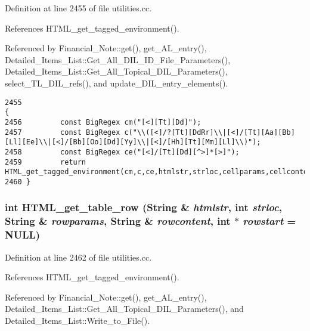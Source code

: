 Definition at line 2455 of file utilities.cc.

References HTML\_\-get\_\-tagged\_\-environment().

Referenced by Financial\_\-Note::get(), get\_\-AL\_\-entry(), Detailed\_\-Items\_\-List::Get\_\-All\_\-DIL\_\-ID\_\-File\_\-Parameters(), Detailed\_\-Items\_\-List::Get\_\-All\_\-Topical\_\-DIL\_\-Parameters(), select\_\-TL\_\-DIL\_\-refs(), and update\_\-DIL\_\-entry\_\-elements().



\footnotesize\begin{verbatim}2455                                                                                                                          {
2456         const BigRegex cm("[<][Tt][Dd]");
2457         const BigRegex c("\\([<]/?[Tt][DdRr]\\|[<]/[Tt][Aa][Bb][Ll][Ee]\\|[<]/[Bb][Oo][Dd][Yy]\\|[<]/[Hh][Tt][Mm][Ll]\\)");
2458         const BigRegex ce("[<]/[Tt][Dd][^>]*[>]");
2459         return HTML_get_tagged_environment(cm,c,ce,htmlstr,strloc,cellparams,cellcontent,cellstart);
2460 }
\end{verbatim}\normalsize 
{}
\subsubsection{\setlength{\rightskip}{0pt plus 5cm}int HTML\_\-get\_\-table\_\-row ({\bf String} \& {\em htmlstr}, int {\em strloc}, {\bf String} \& {\em rowparams}, {\bf String} \& {\em rowcontent}, int $\ast$ {\em rowstart} = NULL)}\label{utilities_8cc_a55}




Definition at line 2462 of file utilities.cc.

References HTML\_\-get\_\-tagged\_\-environment().

Referenced by Financial\_\-Note::get(), get\_\-AL\_\-entry(), Detailed\_\-Items\_\-List::Get\_\-All\_\-Topical\_\-DIL\_\-Parameters(), and Detailed\_\-Items\_\-List::Write\_\-to\_\-File().



